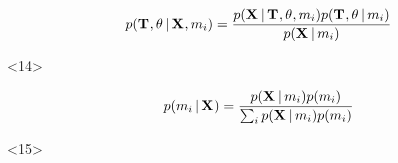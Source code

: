 \begin{frame}[t]
\begin{minipage}[c][0.1\textheight][c]{\linewidth}
\begin{onlyenv}
\begin{displaybox}[0.85\linewidth]
\begin{minipage}[c][0.1\textheight][c]{\linewidth}
\begin{onlyenv}
                        \[
                            p(
                              \divTimeMapVector,
                              \allParameters{}
                              \given \alignmentVector, \divModel{i})
                              =
                            \frac{
                                p(\alignmentVector \given
                                  \divTimeMapVector,
                                  \allParameters{},
                                  \divModel{i}
                                  )
                                  p(
                                    \divTimeMapVector,
                                    \allParameters{}
                                    \given \divModel{i}
                                    )
                                }{p(\alignmentVector \given \divModel{i})}
                        \]
                    \end{onlyenv}
                    \begin{onlyenv}<14>

                        \vspace{3.5mm}

                        \[
                            p(\divModel{i} \given \alignmentVector) =
                            \frac{
                                p(\alignmentVector \given \divModel{i})
                                p(\divModel{i})
                            }{
                                \sum_{i} p(\alignmentVector \given \divModel{i})
                                p(\divModel{i})
                            }
                        \]
                    \end{onlyenv}
                    \begin{onlyenv}<15>

                        \vspace{2mm}


\end{onlyenv}
\end{minipage}
\end{displaybox}
\end{onlyenv}
\end{minipage}
\end{frame}
